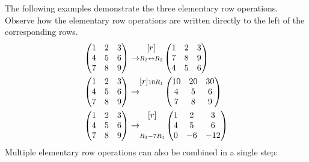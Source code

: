 \begin{example}
    The following examples demonstrate the three elementary row operations. Observe how the elementary row operations are written directly to the left of the corresponding rows.
    \begin{align*}
        \begin{pmatrix}1 & 2 & 3 \\ 4 & 5 & 6 \\ 7 & 8 & 9\end{pmatrix} \rightarrow& \begin{matrix}[r] \scriptstyle \\ \scriptstyle R_2 \leftrightarrow R_3 \\ \scriptstyle \end{matrix} \begin{pmatrix}1 & 2 & 3 \\ 7 & 8 & 9 \\ 4 & 5 & 6\end{pmatrix}\\
        \begin{pmatrix}1 & 2 & 3 \\ 4 & 5 & 6 \\ 7 & 8 & 9\end{pmatrix} \rightarrow& \begin{matrix}[r] \scriptstyle 10R_1\\ \scriptstyle \\ \scriptstyle \end{matrix} \begin{pmatrix}10 & 20 & 30 \\ 4 & 5 & 6 \\ 7 & 8 & 9\end{pmatrix}\\
        \begin{pmatrix}1 & 2 & 3 \\ 4 & 5 & 6 \\ 7 & 8 & 9\end{pmatrix} \rightarrow& \begin{matrix}[r] \scriptstyle \\ \scriptstyle \\ \scriptstyle R_3 - 7R_1\end{matrix}\begin{pmatrix}1 & 2 & 3 \\ 4 & 5 & 6 \\ 0 & -6 & -12\end{pmatrix}
    \end{align*}
    Multiple elementary row operations can also be combined in a single step:

\end{example}
